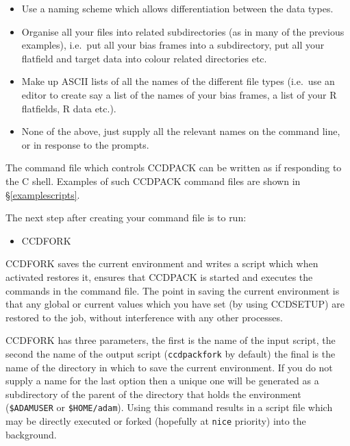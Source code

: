 \documentclass[twoside,11pt]{article}
\newcommand{\hyperref}[4]{#2\ref{#4}#3}
\newcommand{\htmlref}[2]{#1}
\renewcommand{\_}{\texttt{\symbol{95}}}
\newcommand{\text}[1]{{\small \tt #1}}
\newcommand{\routine}[1]{{\sc #1}}
\newcommand{\xroutine}[1]{\htmlref{{\sc #1}}{#1}}
\begin{document}
\begin{itemize}
\item Use a naming scheme which allows differentiation between the data
types.

\item Organise all your files into related subdirectories (as in many of
the previous examples), i.e.\ put all your bias frames into a
subdirectory, put all your flatfield and target data into colour related
directories etc.

\item Make up ASCII lists of all the names of the different file types
(i.e.\ use an editor to create say a list of the names of your bias
frames, a list of your R flatfields, R data etc.).


\item None of the above, just supply all the relevant names on the
command line, or in response to the prompts.
\end{itemize}

The command file which controls CCDPACK can be written as if
responding to the C shell. Examples of such CCDPACK command files
are shown \hyperref{elsewhere}{in \S}{}{examplescripts}.

The next step after creating your command file is to run:
\begin{itemize}
\item \xroutine{CCDFORK}
\end{itemize}

\routine{CCDFORK} saves the current environment and writes a script which
when activated restores it, ensures that CCDPACK is
started and executes the commands in the command file. The point in
saving the current environment is that any global or current values
which you have set (by using \xroutine{CCDSETUP}) are restored to the job,
without interference with any other processes.

\routine{CCDFORK} has three parameters, the first is the name of the input
script, the second the name of the output script (\text{ccdpack\_fork} by
default) the final is the name of the directory in which to save the
current environment. If you do not supply a name for the last option
then a unique one will be generated as a subdirectory of the parent of
the directory that holds the environment (\text{\$ADAM\_USER} or
\text{\$HOME/adam}). Using this command results in a script file which may be
directly executed or forked (hopefully at \text{nice} priority) into
the background.
\end{document}
